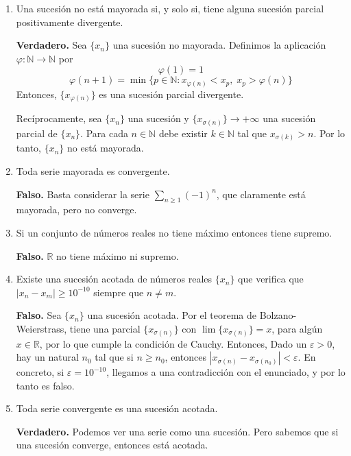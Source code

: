 \documentclass[10pt,a4paper]{article}
\begin{document}
\begin{enumerate}
		\newpage
		
		\item Una sucesión no está mayorada si, y solo si, tiene alguna sucesión parcial positivamente divergente.
		
		\textbf{Verdadero. }Sea $\{x_n\}$ una sucesión no mayorada. Definimos la aplicación $\varphi : \mathbb{N} \rightarrow \mathbb{N}$ por
		$$ \varphi(1) = 1$$ $$\varphi(n+1) = \min\{p \in \mathbb{N} : x_{\varphi(n)} < x_p, \; x_p > \varphi(n)\}$$
		Entonces, $\{x_{\varphi(n)}\}$ es una sucesión parcial divergente. 
		
		Recíprocamente, sea $\{x_n\}$ una sucesión y $\{x_{\sigma(n)}\} \rightarrow + \infty$ una sucesión parcial de $\{x_n\}$. Para cada $n \in \mathbb{N}$ debe existir $k \in \mathbb{N}$ tal que $x_{\sigma(k)} > n$. Por lo tanto, $\{x_n\}$ no está mayorada. \newline
		
		\item Toda serie mayorada es convergente.
		
		\textbf{Falso. }Basta considerar la serie $\displaystyle \sum_{n \geq 1} (-1)^n$, que claramente está mayorada, pero no converge.
		
		\item Si un conjunto de números reales no tiene máximo entonces tiene supremo.
		
		\textbf{Falso. }$\mathbb{R}$ no tiene máximo ni supremo. \newline
		
		\item Existe una sucesión acotada de números reales $\{x_n\}$ que verifica que $|x_n - x_m| \geq 10 ^{-10}$ siempre que $n \neq m$.
		
		\textbf{Falso. }Sea $\{x_n\}$ una sucesión acotada. Por el teorema de Bolzano-Weierstrass, tiene una parcial $\{x_{\sigma(n)}\}$ con $\lim\{x_{\sigma(n)}\} = x$, para algún $x \in \mathbb{R}$, por lo que cumple la condición de Cauchy. Entonces, Dado un $\varepsilon > 0$, hay un natural $n_0$ tal que si $n \geq n_0$, entonces $|x_{\sigma(n)} - x_{\sigma(n_0)}| < \varepsilon$. En concreto, si $\varepsilon = 10^{-10}$, llegamos a una contradicción con el enunciado, y por lo tanto es falso. \newline
				
		\item Toda serie convergente es una sucesión acotada.
		
		\textbf{Verdadero. }Podemos ver una serie como una sucesión. Pero sabemos que si una sucesión converge, entonces está acotada. \newline
		

\end{enumerate}
\end{document}

